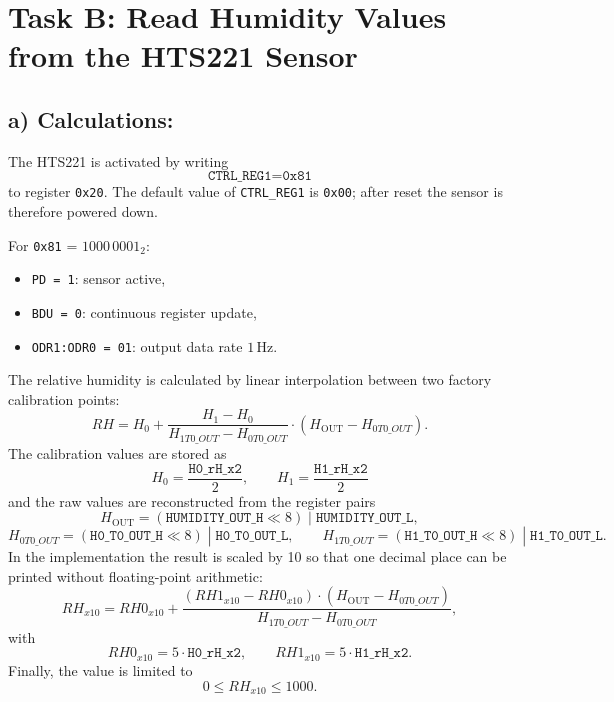 
\section{Task B: Read Humidity Values from the HTS221 Sensor}

\subsection{a) Calculations:}

The HTS221 is activated by writing
\[
	\texttt{CTRL\_REG1} = \texttt{0x81}
\]
to register \texttt{0x20}. The default value of \texttt{CTRL\_REG1} is \texttt{0x00}; after reset the sensor is therefore powered down.

For \texttt{0x81} = $1000\,0001_2$:
\begin{itemize}
	\item \texttt{PD = 1}: sensor active,
	\item \texttt{BDU = 0}: continuous register update,
	\item \texttt{ODR1:ODR0 = 01}: output data rate $1\,\mathrm{Hz}$.
\end{itemize}

The relative humidity is calculated by linear interpolation between two factory calibration points:
\[
	RH = H_0 + \frac{H_1 - H_0}{H_{1T0\_OUT} - H_{0T0\_OUT}} \cdot \left(H_{\mathrm{OUT}} - H_{0T0\_OUT}\right).
\]
The calibration values are stored as
\[
	H_0 = \frac{\texttt{H0\_rH\_x2}}{2}, \qquad H_1 = \frac{\texttt{H1\_rH\_x2}}{2}
\]
and the raw values are reconstructed from the register pairs
\[
	H_{\mathrm{OUT}} = (\texttt{HUMIDITY\_OUT\_H} \ll 8)\;|\;\texttt{HUMIDITY\_OUT\_L},
\]
\[
	H_{0T0\_OUT} = (\texttt{H0\_T0\_OUT\_H} \ll 8)\;|\;\texttt{H0\_T0\_OUT\_L}, \qquad
	H_{1T0\_OUT} = (\texttt{H1\_T0\_OUT\_H} \ll 8)\;|\;\texttt{H1\_T0\_OUT\_L}.
\]
In the implementation the result is scaled by 10 so that one decimal place can be printed without floating-point arithmetic:
\[
	RH_{x10} = RH0_{x10} + \frac{(RH1_{x10} - RH0_{x10})\cdot(H_{\mathrm{OUT}} - H_{0T0\_OUT})}{H_{1T0\_OUT} - H_{0T0\_OUT}},
\]
with
\[
	RH0_{x10} = 5\cdot\texttt{H0\_rH\_x2}, \qquad RH1_{x10} = 5\cdot\texttt{H1\_rH\_x2}.
\]
Finally, the value is limited to
\[
	0 \le RH_{x10} \le 1000.
\]

